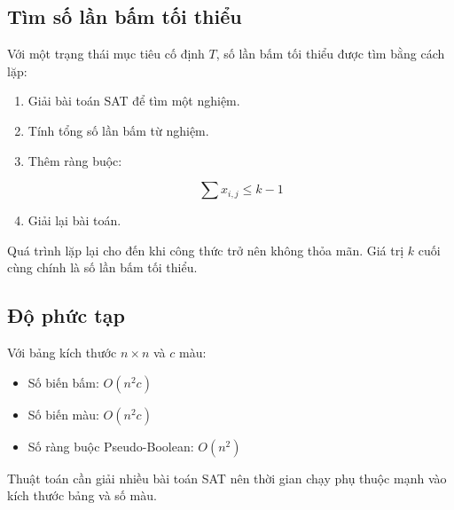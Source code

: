 \subsection{Tìm số lần bấm tối thiểu}

Với một trạng thái mục tiêu cố định $T$, số lần bấm tối thiểu
được tìm bằng cách lặp:

\begin{enumerate}

\item Giải bài toán SAT để tìm một nghiệm.

\item Tính tổng số lần bấm từ nghiệm.

\item Thêm ràng buộc:

\[
\sum x_{i,j} \le k - 1
\]

\item Giải lại bài toán.

\end{enumerate}

Quá trình lặp lại cho đến khi công thức trở nên
không thỏa mãn. Giá trị $k$ cuối cùng chính là
số lần bấm tối thiểu.

\subsection{Độ phức tạp}

Với bảng kích thước $n \times n$ và $c$ màu:

\begin{itemize}

\item Số biến bấm: $O(n^2 c)$

\item Số biến màu: $O(n^2 c)$

\item Số ràng buộc Pseudo-Boolean: $O(n^2)$

\end{itemize}

Thuật toán cần giải nhiều bài toán SAT nên
thời gian chạy phụ thuộc mạnh vào kích thước bảng
và số màu.
